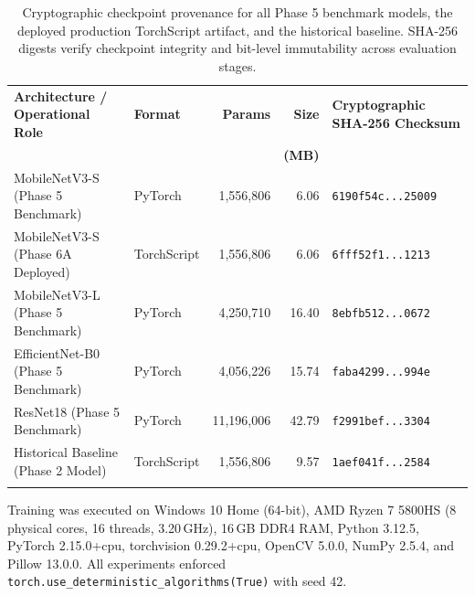\documentclass[pdflatex,sn-mathphys-num]{sn-jnl}
\theoremstyle{thmstyleone}%
\theoremstyle{thmstyletwo}%
\theoremstyle{thmstylethree}%
\begin{document}
\begin{table}[htbp]
\caption{Cryptographic checkpoint provenance for all Phase 5 benchmark models, the deployed production TorchScript artifact, and the historical baseline. SHA-256 digests verify checkpoint integrity and bit-level immutability across evaluation stages.}\label{tab:checkpoints}%
\footnotesize
\setlength{\tabcolsep}{2pt}%
\begin{tabular*}{\textwidth}{@{\extracolsep\fill}>{\raggedright\arraybackslash}p{3.4cm}lrrl}
\toprule
\textbf{Architecture / Operational Role} & \textbf{Format} & \textbf{Params} & \textbf{Size} & \textbf{Cryptographic SHA-256 Checksum} \\
& & & \textbf{(MB)} & \\
\midrule
MobileNetV3-S (Phase 5 Benchmark) & PyTorch & 1{,}556{,}806 & 6.06 & \texttt{6190f54c...25009} \\
MobileNetV3-S (Phase 6A Deployed)  & TorchScript & 1{,}556{,}806 & 6.06 & \texttt{6fff52f1...1213} \\
MobileNetV3-L (Phase 5 Benchmark) & PyTorch & 4{,}250{,}710 & 16.40 & \texttt{8ebfb512...0672} \\
EfficientNet-B0 (Phase 5 Benchmark)   & PyTorch & 4{,}056{,}226 & 15.74 & \texttt{faba4299...994e} \\
ResNet18 (Phase 5 Benchmark)          & PyTorch & 11{,}196{,}006 & 42.79 & \texttt{f2991bef...3304} \\
Historical Baseline (Phase 2 Model)   & TorchScript & 1{,}556{,}806 & 9.57 & \texttt{1aef041f...2584} \\
\botrule
\end{tabular*}
\end{table}

\noindent Training was executed on Windows 10 Home (64-bit), AMD Ryzen 7 5800HS (8 physical cores, 16 threads, 3.20\,GHz), 16\,GB DDR4 RAM, Python 3.12.5, PyTorch 2.15.0+cpu, torchvision 0.29.2+cpu, OpenCV 5.0.0, NumPy 2.5.4, and Pillow 13.0.0. All experiments enforced \texttt{torch.use\_deterministic\_algorithms(True)} with seed 42.
\end{document}
